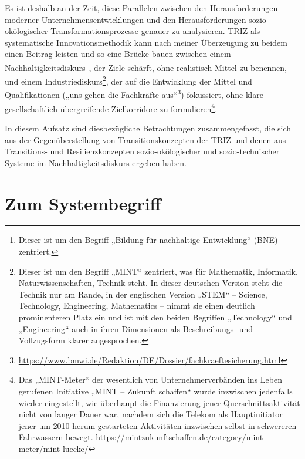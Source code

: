 \documentclass[12pt,a4paper]{article}
\begin{document}
Es ist deshalb an der Zeit, diese Parallelen zwischen den Herausforderungen
moderner Unternehmensentwicklungen und den Herausforderungen
sozio-okölogischer Transformationsprozesse genauer zu analysieren.  TRIZ als
systematische Innovationsmethodik kann nach meiner Überzeugung zu beidem einen
Beitrag leisten und so eine Brücke bauen zwischen einem
Nachhaltigkeitsdiskurs\footnote{Dieser ist um den Begriff „Bildung für
  nachhaltige Entwicklung“ (BNE) zentriert. }, der Ziele schärft, ohne
realistisch Mittel zu benennen, und einem Industriediskurs\footnote{Dieser ist
  um den Begriff „MINT“ zentriert, was für Mathematik, Informatik,
  Naturwissenschaften, Technik steht. In dieser deutschen Version steht die
  Technik nur am Rande, in der englischen Version „STEM“ -- Science,
  Technology, Engineering, Mathematics -- nimmt sie einen deutlich
  prominenteren Platz ein und ist mit den beiden Begriffen „Technology“ und
  „Engineering“ auch in ihren Dimensionen als Beschreibungs- und Vollzugsform
  klarer angesprochen.}, der auf die Entwicklung der Mittel und
Qualifikationen („uns gehen die Fachkräfte
aus“\footnote{\url{https://www.bmwi.de/Redaktion/DE/Dossier/fachkraeftesicherung.html}})
fokussiert, ohne klare gesellschaftlich übergreifende Zielkorridore zu
formulieren\footnote{Das „MINT-Meter“ der wesentlich von Unternehmerverbänden
  ins Leben gerufenen Initiative „MINT -- Zukunft schaffen“ wurde inzwischen
  jedenfalls wieder eingestellt, wie überhaupt die Finanzierung jener
  Querschnittsaktivität nicht von langer Dauer war, nachdem sich die Telekom
  als Hauptinitiator jener um 2010 herum gestarteten Aktivitäten inzwischen
  selbst in schwereren Fahrwassern bewegt.
  \url{https://mintzukunftschaffen.de/category/mint-meter/mint-luecke/}}.

In diesem Aufsatz sind diesbezügliche Betrachtungen zusammengefasst, die sich
aus der Gegenüberstellung von Transitionskonzepten der TRIZ und denen aus
Transitions- und Resilienzkonzepten sozio-okölogischer und sozio-technischer
Systeme im Nachhaltigkeitsdiskurs ergeben haben.  

\section{Zum Systembegriff}
\end{document}
